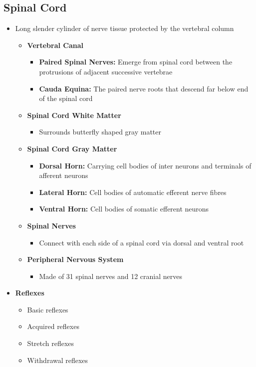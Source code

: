 \documentclass[11pt]{article}
\begin{document}
\subsection{Spinal Cord}
\begin{itemize}
\item Long slender cylinder of nerve tissue protected by the vertebral column
\begin{itemize}
\item \textbf{Vertebral Canal}
\begin{itemize}
\item \textbf{Paired Spinal Nerves: }Emerge from spinal cord between the protrusions of adjacent successive vertebrae
\item \textbf{Cauda Equina:} The paired nerve roots that descend far below end of the spinal cord
\end{itemize}
\item \textbf{Spinal Cord White Matter}
\begin{itemize}
\item Surrounds butterfly shaped gray matter
\end{itemize}
\item \textbf{Spinal Cord Gray Matter}
\begin{itemize}
\item \textbf{Dorsal Horn:} Carrying cell bodies of inter neurons and terminals of afferent neurons
\item \textbf{Lateral Horn: }Cell bodies of automatic efferent nerve fibres
\item \textbf{Ventral Horn: }Cell bodies of somatic efferent neurons
\end{itemize}
\item\textbf{ Spinal Nerves}
\begin{itemize}
\item Connect with each side of a spinal cord via dorsal and ventral root
\end{itemize}
\item \textbf{Peripheral Nervous System}
\begin{itemize}
\item Made of 31 spinal nerves and 12 cranial nerves
\end{itemize}
\end{itemize}
\item \textbf{Reflexes}
\begin{itemize}
\item Basic reflexes 
\item Acquired reflexes
\item Stretch reflexes
\item Withdrawal reflexes 
\end{itemize}
\end{itemize}
\end{document}
